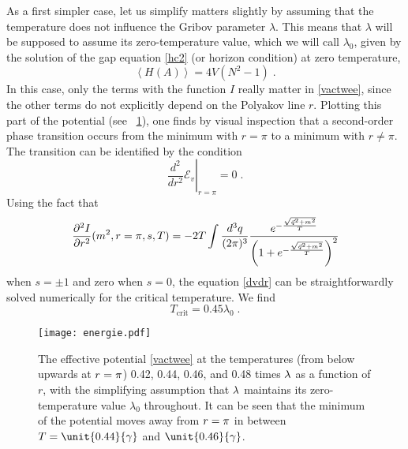 As a first simpler case, let us simplify matters slightly by assuming that the temperature does
not influence the Gribov parameter $\lambda$. This means that $\lambda$ will be supposed to
assume its zero-temperature value, which we will call $\lambda_{0}$, given by the solution of
the gap equation \eqref{hc2} (or horizon condition) at zero temperature,
\begin{equation}
\left\langle H(A)   \right\rangle = 4V \left(  N^{2}-1\right) \;.
\end{equation}
In this case, only
the terms with the function $I$ really matter in \eqref{vactwee}, since the other terms do not
explicitly depend on the Polyakov line $r$. Plotting this part of the potential (see
\figurename\ \ref{energieplot}), one finds by visual inspection that a second-order phase
transition occurs from the minimum with $r=\pi$ to a minimum with $r\not=\pi$. The transition
can be identified by the condition
\begin{equation}  
\label{dvdr} 
\left. \frac{d^2}{dr^2}
\mathcal{E}_{v} \right|_{r=\pi} = 0 \;.
\end{equation}
Using the fact that
\begin{equation}
\frac{\partial^2I}{\partial r^2}(m^2,r=\pi,s,T) = -2T \int\frac{d^{3}q}{%
(2\pi)^{3}}\frac{e^{-\frac{\sqrt{\vec{q}^2+m^2}}{T}}}{\left(1+e^{-\frac{%
\sqrt{\vec{q}^2+m^2}}T}\right)^2}
\end{equation}
when $s=\pm1$ and zero when $s=0$, the equation \eqref{dvdr} can be
straightforwardly solved numerically for the critical temperature. We find
\begin{equation}  \label{Tcrit}
	T_\text{crit} = \unit{0.45}{\lambda}_{0} \;.
\end{equation}

\begin{figure}[tbp]
\begin{center}
\texttt{[image: energie.pdf]}
\end{center}
\caption{The effective potential \eqref{vactwee} at the temperatures (from
below upwards at $r=\protect\pi$) 0.42, 0.44, 0.46, and 0.48 times $\protect\lambda$ as a function of $r$, with the simplifying assumption that $\protect%
\lambda$ maintains its zero-temperature value $\lambda_0$ throughout. It can be seen that
the minimum of the potential moves away from $r=\protect\pi$ in between $T=%
\unit{0.44}{\protect\gamma}$ and $\unit{0.46}{\protect\gamma}$. }
\label{energieplot}
\end{figure}

